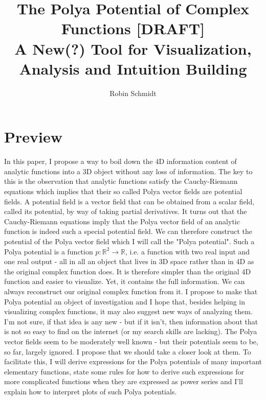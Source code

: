 \documentclass[12pt]{article}
\begin{document}
\parindent=0in
\parskip=0pt

 \setcounter{page}{1}

\title{The Polya Potential of Complex Functions [DRAFT]\\ {\Large A New(?) Tool for Visualization, Analysis and Intuition Building}}
\author{Robin Schmidt}
\maketitle

\section{Preview}
In this paper, I propose a way to boil down the 4D information content of analytic functions into a 3D object without any loss of information. The key to this is the observation that analytic functions satisfy the Cauchy-Riemann equations which implies that their so called Polya vector fields are potential fields. A potential field is a vector field that can be obtained from a scalar field, called its potential, by way of taking partial derivatives. It turns out that the Cauchy-Riemann equations imply that the Polya vector field of an analytic function is indeed such a special potential field. We can therefore construct the potential of the Polya vector field which I will call the "Polya potential". Such a Polya potential is a function $p: \mathbb{R}^2 \rightarrow \mathbb{R}$, i.e. a function with two real input and one real output - all in all an object that lives in 3D space rather than in 4D as the original complex function does. It is therefore simpler than the original 4D function and easier to visualize. Yet, it contains the full information. We can always reconstruct our original complex function from it. I propose to make that Polya potential an object of investigation and I hope that, besides helping in visualizing complex functions, it may also suggest new ways of analyzing them. I'm not sure, if that idea is any new - but if it isn't, then information about that is not so easy to find on the internet (or my search skills are lacking). The Polya vector fields seem to be moderately well known - but their potentials seem to be, so far, largely ignored. I propose that we should take a closer look at them. To facilitate this, I will derive expressions for the Polya potentials of many important elementary functions, state some rules for how to derive such expressions for more complicated functions when they are expressed as power series and I'll explain how to interpret plots of such Polya potentials. 
\end{document}
